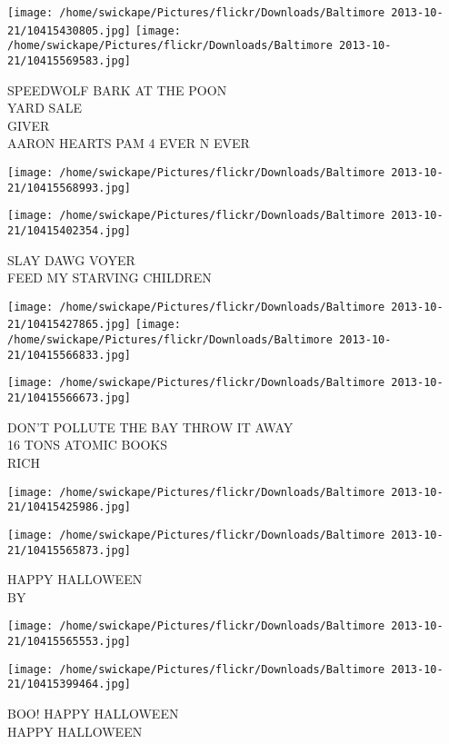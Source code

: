 \documentclass[10pt,letterpaper]{article}
\begin{document}
\texttt{[image: /home/swickape/Pictures/flickr/Downloads/Baltimore 2013-10-21/10415430805.jpg]}
\texttt{[image: /home/swickape/Pictures/flickr/Downloads/Baltimore 2013-10-21/10415569583.jpg]}

SPEEDWOLF BARK AT THE POON\\
YARD SALE\\
GIVER\\
AARON HEARTS PAM 4 EVER N EVER
\pagebreak

\texttt{[image: /home/swickape/Pictures/flickr/Downloads/Baltimore 2013-10-21/10415568993.jpg]}

\vspace{0.25in}
\texttt{[image: /home/swickape/Pictures/flickr/Downloads/Baltimore 2013-10-21/10415402354.jpg]}

SLAY DAWG VOYER\\
FEED MY STARVING CHILDREN
\pagebreak

\texttt{[image: /home/swickape/Pictures/flickr/Downloads/Baltimore 2013-10-21/10415427865.jpg]}
\texttt{[image: /home/swickape/Pictures/flickr/Downloads/Baltimore 2013-10-21/10415566833.jpg]}

\vspace{0.25in}
\texttt{[image: /home/swickape/Pictures/flickr/Downloads/Baltimore 2013-10-21/10415566673.jpg]}

DON'T POLLUTE THE BAY THROW IT AWAY\\
16 TONS ATOMIC BOOKS\\
RICH
\pagebreak

\texttt{[image: /home/swickape/Pictures/flickr/Downloads/Baltimore 2013-10-21/10415425986.jpg]}

\vspace{0.25in}
\texttt{[image: /home/swickape/Pictures/flickr/Downloads/Baltimore 2013-10-21/10415565873.jpg]}

HAPPY HALLOWEEN\\
BY
\pagebreak

\texttt{[image: /home/swickape/Pictures/flickr/Downloads/Baltimore 2013-10-21/10415565553.jpg]}

\vspace{0.25in}
\texttt{[image: /home/swickape/Pictures/flickr/Downloads/Baltimore 2013-10-21/10415399464.jpg]}

BOO! HAPPY HALLOWEEN\\
HAPPY HALLOWEEN
\pagebreak
\end{document}
